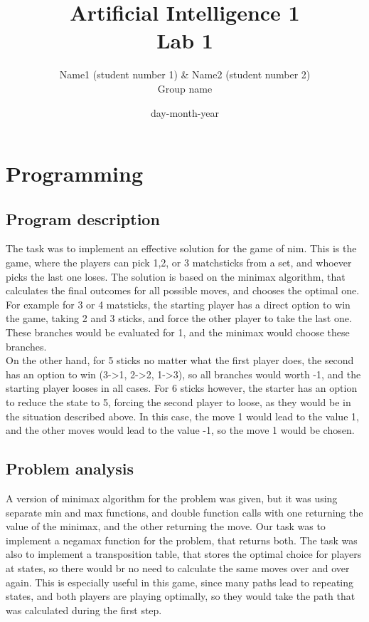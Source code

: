 \documentclass{article}
\title{Artificial Intelligence 1 \\ Lab 1}%
\author{Name1 (student number 1) \& Name2 (student number 2) \\ Group name} %
\date{day-month-year}%
\begin{document}
\maketitle


\section*{Programming} 
\subsection*{Program description}
The task was to implement an effective solution for the game of nim. This is the game, where the players can pick 1,2, or 3 matchsticks from a set, and whoever picks the last one loses. The solution is based on the minimax algorithm, that calculates the final outcomes for all possible moves, and chooses the optimal one.\\
For example for 3 or 4 matsticks, the starting player has a direct option to win the game, taking 2 and 3 sticks, and force the other player to take the last one. These branches would be evaluated for 1, and the minimax would choose these branches.\\
On the other hand, for 5 sticks no matter what the first player does, the second has an option to win (3->1, 2->2, 1->3), so all branches would worth -1, and the starting player looses in all cases. For 6 sticks however, the starter has an option to reduce the state to 5, forcing the second player to loose, as they would be in the situation described above. In this case, the move 1 would lead to the value 1, and the other moves would lead to the value -1, so the move 1 would be chosen.
\subsection*{Problem analysis}
A version of minimax algorithm for the problem was given, but it was using separate min and max functions, and double function calls with one returning the value of the minimax, and the other returning the move. Our task was to implement a negamax function for the problem, that returns both. The task was also to implement a transposition table, that stores the optimal choice for players at states, so there would br no need to calculate the same moves over and over again. This is especially useful in this game, since many paths lead to repeating states, and both players are playing optimally, so they would take the path that was calculated during the first step.
\end{document}

